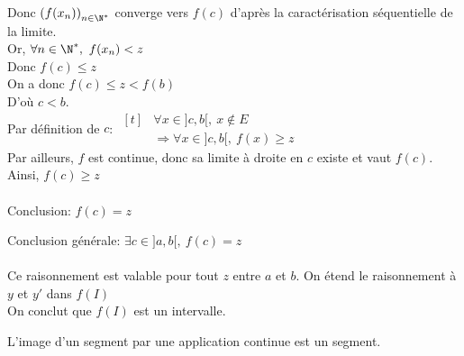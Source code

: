 \documentclass[12pt,twoside,a4paper]{article}
\begin{document}
\begin{preuve}
\begin{tab}
				Donc $\left( f(x_n)\right) _{n\in\N^{*}}$ converge vers $f(c)$ d'apr\`es la caract\'erisation s\'equentielle de la limite.\\
				Or, $\forall n\in\N^{*},\ f(x_n)<z$\\
				Donc $f(c)\leqslant z$\\
				On a donc $f(c)\leqslant z<f(b)$\\
				D'o\`u $c<b$.\\
				Par d\'efinition de $c$: $\begin{aligned}[t]
				& \forall x\in ]c,b[,\ x\notin E\\
				& \Rightarrow \forall x\in ]c,b[,\ f(x)\geqslant z
				\end{aligned}$\\
				Par ailleurs, $f$ est continue, donc sa limite \`a droite en $c$ existe et vaut $f(c)$.\\
				Ainsi, $f(c)\geqslant z$\\
				\\
				Conclusion: $f(c)=z$
			\end{tab}	
			Conclusion g\'en\'erale: $\exists c\in ]a,b[,\ f(c)=z$\\
			\\
			Ce raisonnement est valable pour tout $z$ entre $a$ et $b$. On \'etend le raisonnement \`a $y$ et $y'$ dans $f(I)$\\
			On conclut que $f(I)$ est un intervalle.
		\end{preuve}
		\begin{prop}
			L'image d'un segment par une application continue est un segment.
		\end{prop}
\end{document}
